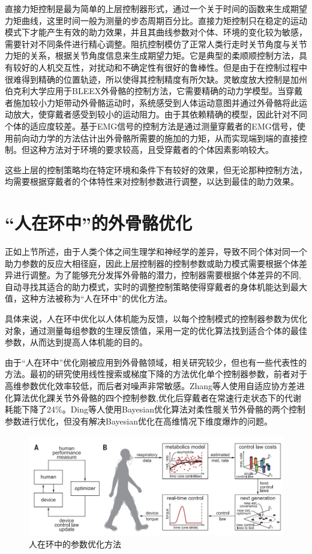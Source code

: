 直接力矩控制是最为简单的上层控制器形式，通过一个关于时间的函数来生成期望力矩曲线\cite{p32,p33}，这里时间一般为测量的步态周期百分比。直接力矩控制只在稳定的运动模式下才能产生有效的助力效果，并且其曲线参数对个体、环境的变化较为敏感，需要针对不同条件进行精心调整。阻抗控制模仿了正常人类行走时关节角度与关节力矩的关系，根据关节角度信息来生成期望力矩\cite{p34}。它是典型的柔顺顺控制方法，具有较好的人机交互性，对扰动和不确定性有很好的鲁棒性。但是由于在控制过程中很难得到精确的位置轨迹，所以使得其控制精度有所欠缺。灵敏度放大控制是加州伯克利大学应用于BLEEX外骨骼的控制方法\cite{p35}，它需要精确的动力学模型。当穿戴者施加较小力矩带动外骨骼运动时，系统感受到人体运动意图并通过外骨骼将此运动放大，使穿戴者感受到较小的运动阻力。由于其依赖精确的模型，因此针对不同个体的适应度较差。基于EMG信号的控制方法是通过测量穿戴者的EMG信号，使用前向动力学的方法估计出外骨骼所需要的施加的力矩，从而实现端到端的直接控制\cite{p36}。但这种方法对于环境的要求较高，且受穿戴者的个体因素影响较大。

这些上层的控制策略均在特定环境和条件下有较好的效果，但无论那种控制方法，均需要根据穿戴者的个体特性来对控制参数进行调整，以达到最佳的助力效果。

\section{“人在环中”的外骨骼优化}

正如上节所述，由于人类个体之间生理学和神经学的差异，导致不同个体对同一个助力参数的反应大相径庭\cite{p37}，因此上层控制器的控制参数或助力模式需要根据个体差异进行调整。为了能够充分发挥外骨骼的潜力，控制器需要根据个体差异的不同,自动寻找其适合的助力模式，实时的调整控制策略使得穿戴者的身体机能达到最大值，这种方法被称为“人在环中”的优化方法\cite{p38}。

具体来说，人在环中优化以人体机能为反馈，以每个控制模式的控制器参数为优化对象，通过测量每组参数的生理反馈值，采用一定的优化算法找到适合个体的最佳参数，从而达到提高人体机能的目的。

由于“人在环中”优化刚被应用到外骨骼领域，相关研究较少，但也有一些代表性的方法。最初的研究使用线性搜索\cite{p38}或梯度下降\cite{p39}的方法优化单个控制器参数，前者对于高维参数优化效率较低，而后者对噪声非常敏感。Zhang等人使用自适应协方差进化算法优化踝关节外骨骼的四个控制参数\cite{P40},优化后穿戴者在常速行走状态下的代谢耗能下降了24\%。Ding等人使用Bayesian优化算法对柔性髋关节外骨骼的两个控制参数进行优化\cite{p41}，但没有解决Bayesian优化在高维情况下维度爆炸的问题。

\begin{figure}[htb]
    \includegraphics[width=15cm]{fig/f18.jpg}
    \caption{人在环中的参数优化方法}
    \label{fig:mark}
\end{figure}

